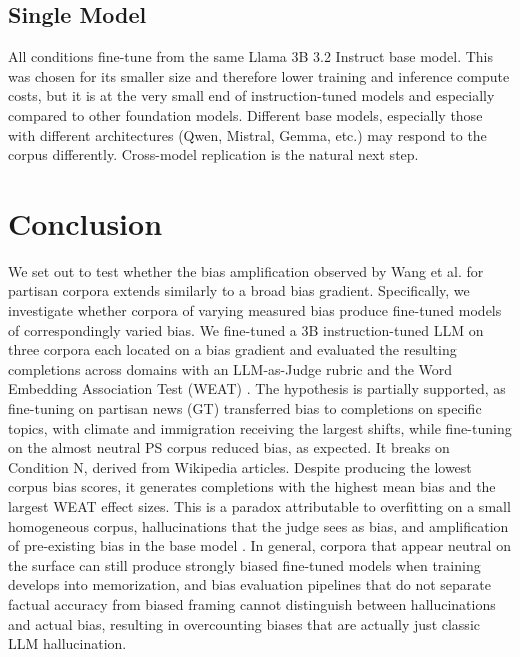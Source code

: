 \documentclass{article}
\begin{document}
\subsection{Single Model}
All conditions fine-tune from the same Llama 3B 3.2 Instruct base model. This was chosen for its smaller size and therefore lower training and inference compute costs, but it is at the very small end of instruction-tuned models and especially compared to other foundation models. 
Different base models, especially those with different architectures (Qwen, Mistral, Gemma, etc.) may respond to the corpus differently. 
Cross-model replication is the natural next step.
 
\section{Conclusion}
We set out to test whether the bias amplification observed by Wang et al. \cite{wang2024bias} for partisan corpora extends similarly to a broad bias gradient. 
Specifically, we investigate whether corpora of varying measured bias produce fine-tuned models of correspondingly varied bias. 
We fine-tuned a 3B instruction-tuned LLM on three corpora each located on a bias gradient and evaluated the resulting completions across domains with an LLM-as-Judge rubric and the Word Embedding Association Test (WEAT) \cite{caliskan2017}. 
The hypothesis is partially supported, as fine-tuning on partisan news (GT) transferred bias to completions on specific topics, with climate and immigration receiving the largest shifts, while fine-tuning on the almost neutral PS corpus reduced bias, as expected.
It breaks on Condition N, derived from Wikipedia articles. 
Despite producing the lowest corpus bias scores, it generates completions with the highest mean bias and the largest WEAT effect sizes.
This is a paradox attributable to overfitting on a small homogeneous corpus, hallucinations that the judge sees as bias, and amplification of pre-existing bias in the base model \cite{wang2024bias}.
In general, corpora that appear neutral on the surface can still produce strongly biased fine-tuned models when training develops into memorization, and bias evaluation pipelines that do not separate factual accuracy from biased framing cannot distinguish between hallucinations and actual bias, resulting in overcounting biases that are actually just classic LLM hallucination. 
\end{document}
